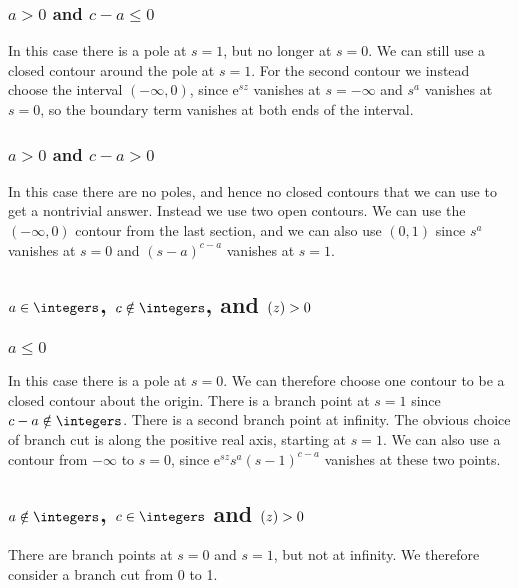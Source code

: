 \documentclass[fleqn]{NotesClass}
\newcommand*{\e}{\mathrm{e}}
\let\Re\relax
\DeclareMathOperator{\Re}{Re}
\begin{document}
    \subsubsection{\texorpdfstring{\(a > 0\) and \(c - a \le 0\)}{a Positive and c - a Less Than or Equal to Zero}}
    In this case  there is a pole at \(s = 1\), but no longer at \(s = 0\).
    We can still use a closed contour around the pole at \(s = 1\).
    For the second contour we instead choose the interval \((-\infty, 0)\), since \(\e^{sz}\) vanishes at \(s = -\infty\) and \(s^a\) vanishes at \(s = 0\), so the boundary term vanishes at both ends of the interval.
    
    \subsubsection{\texorpdfstring{\(a > 0\) and \(c - a > 0\)}{a and c - a Positive}}
    In this case there are no poles, and hence no closed contours that we can use to get a nontrivial answer.
    Instead we use two open contours.
    We can use the \((-\infty, 0)\) contour from the last section, and we can also use \((0, 1)\) since \(s^a\) vanishes at \(s = 0\) and \((s - a)^{c - a}\) vanishes at \(s = 1\).
    
    \subsection{\texorpdfstring{\(a \in \integers\), \(c \notin \integers\), and \(\Re(z) > 0\)}{Integer a, Noninteger c, and Positive Re(z)}}
    \subsubsection{\texorpdfstring{\(a \le 0\)}{a Less Than or Equal to 0}}
    In this case there is a pole at \(s = 0\).
    We can therefore choose one contour to be a closed contour about the origin.
    There is a branch point at \(s = 1\) since \(c - a \notin \integers\).
    There is a second branch point at infinity.
    The obvious choice of branch cut is along the positive real axis, starting at \(s = 1\).
    We can also use a contour from \(-\infty\) to \(s = 0\), since \(\e^{sz}s^a(s - 1)^{c - a}\) vanishes at these two points.
    
    \subsection{\texorpdfstring{\(a \notin \integers\), \(c \in \integers\) and \(\Re(z) > 0\)}{Noninteger a, Integer c, and Re(z) Positive}}
    There are branch points at \(s = 0\) and \(s = 1\), but not at infinity.
    We therefore consider a branch cut from 0 to 1.
    
\end{document}
